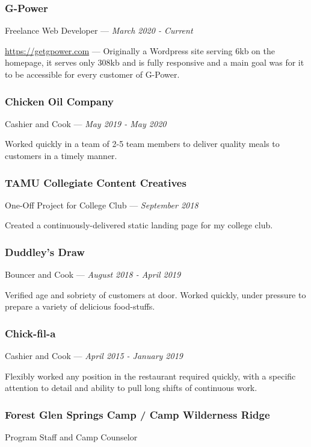 \documentclass[letterpaper,10pt]{article}
\begin{document}
    \subsubsection{G-Power}
    \hfill Freelance Web Developer --- \emph{March 2020 - Current}

    \href{https://getgpower.com}{https://getgpower.com} --- Originally a Wordpress site serving 6kb on the homepage, it serves only 308kb and is fully responsive and a main goal was for it to be accessible for every customer of G-Power.

    \subsubsection{Chicken Oil Company}
    \hfill Cashier and Cook --- \emph{May 2019 - May 2020}

    Worked quickly in a team of 2-5 team members to deliver quality meals to customers in a timely manner.

    \subsubsection{TAMU Collegiate Content Creatives}
    \hfill One-Off Project for College Club --- \emph{September 2018}

    Created a continuously-delivered static landing page for my college club.

    \subsubsection{Duddley's Draw}
    \hfill Bouncer and Cook --- \emph{August 2018 - April 2019}

    Verified age and sobriety of customers at door. Worked quickly, under pressure to prepare a variety of delicious food-stuffs.


    \subsubsection{Chick-fil-a}
    \hfill Cashier and Cook --- \emph{April 2015 - January 2019}

    Flexibly worked any position in the restaurant required quickly, with a specific attention to detail and ability to pull long shifts of continuous work.

    \subsubsection{Forest Glen Springs Camp / Camp Wilderness Ridge}
    \hfill Program Staff and Camp Counselor 
    
\end{document}

